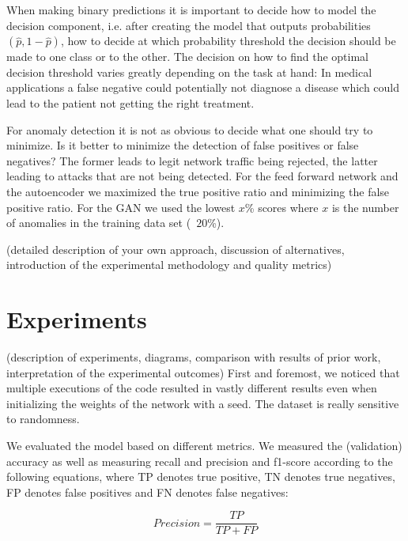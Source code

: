 \documentclass[]{article}
\begin{document}
     When making binary predictions it is important to decide how to model the decision component, i.e. after creating the model that outputs probabilities $(\hat{p}, 1-\hat{p})$, how to decide at which probability threshold the decision should be made to one class or to the other. The decision on how to find the optimal decision threshold varies greatly depending on the task at hand: In medical applications a false negative could potentially not diagnose a disease which could lead to the patient not getting the right treatment.
     
     For anomaly detection it is not as obvious to decide what one should try to minimize. Is it better to minimize the detection of false positives or false negatives? The former leads to legit network traffic being rejected, the latter leading to attacks that are not being detected. For the feed forward network and the autoencoder we maximized the true positive ratio and minimizing the false positive ratio. For the GAN we used the lowest $x$\% scores where $x$ is the number of anomalies in the training data set (~$20$\%).
     
     
	(detailed description of your own approach, discussion of alternatives, introduction of the experimental methodology and quality metrics)
	
	
	\section{Experiments}
	(description of experiments, diagrams, comparison with results of prior work, interpretation of the experimental outcomes)
	First and foremost, we noticed that multiple executions of the code resulted in vastly different results even when initializing the weights of the network with a seed. The dataset is really sensitive to randomness.
	
	We evaluated the model based on different metrics. We measured the (validation) accuracy as well as measuring recall and precision and f1-score according to the following equations, where TP denotes true positive, TN denotes true negatives, FP denotes false positives and FN denotes false negatives: 
	
	\begin{equation}
		Precision = \frac{TP}{TP + FP}
	\end{equation}
	
\end{document}
